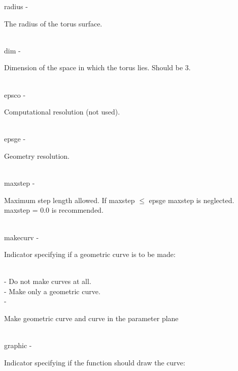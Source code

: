         \>\>    {\fov radius}\> - \>    \begin{minipg2}
                                The radius of the torus surface.
                                \end{minipg2}\\
        \>\>    {\fov dim}\> - \>       \begin{minipg2}
                                Dimension of the space in which the torus lies.
                                Should be 3.
                                \end{minipg2}\\[0.8ex]
        \>\>    {\fov epsco}\> - \>     \begin{minipg2}
                                Computational resolution (not used).
                                \end{minipg2}\\
        \>\>    {\fov epsge}\> - \>     \begin{minipg2}
                                Geometry resolution.
                                \end{minipg2}\\
        \>\>    {\fov maxstep}\> - \>   \begin{minipg2}
                                Maximum step length allowed.
                                If maxstep $\leq$ epsge maxstep is
                                neglected. maxstep = 0.0 is recommended.
                                \end{minipg2}\\[0.8ex]
        \>\>    {\fov makecurv}\> - \>  \begin{minipg2}
                                Indicator specifying if a geometric curve is to be made:
                                \end{minipg2}\\
                \>\>\>\> -     \>Do not make curves at all.\\
                \>\>\>\> -     \>Make only a geometric curve.\\
                \>\>\>\> -     \>\begin{minipg5}
                                        Make geometric curve and curve in the parameter
                                        plane
                                        \end{minipg5} \\[0.3ex]
\newpagetabs
        \>\>    {\fov graphic}\> - \>   \begin{minipg2}
                                Indicator specifying if the function
                                should draw the curve:
                                \end{minipg2}\\
